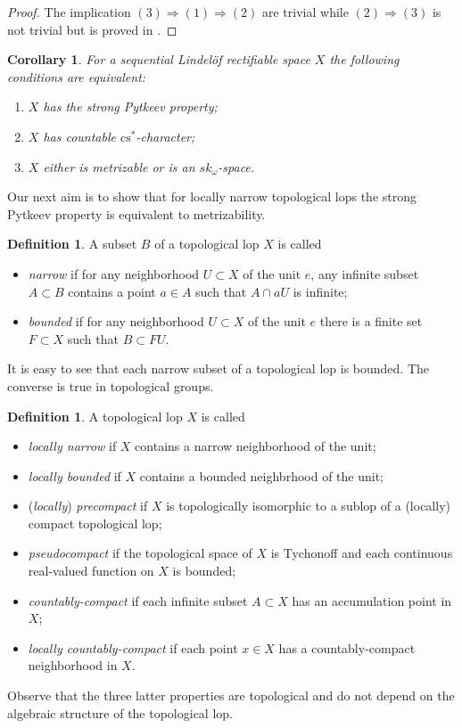 \documentclass{amsart}
\newtheorem{corollary}[theorem]{Corollary}
\theoremstyle{definition}
\newtheorem{definition}[theorem]{Definition}
\begin{document}
\begin{proof} The implication $(3){\Rightarrow}(1){\Rightarrow}(2)$ are trivial while $(2){\Rightarrow}(3)$ is not trivial but is proved in \cite{BR}.
\end{proof}

\begin{corollary}\label{t:normrec} For a sequential Lindel\"of rectifiable space $X$ the following conditions are equivalent:
\begin{enumerate}
\item $X$ has the strong Pytkeev property;
\item $X$ has countable ${\mathrm{cs}}^*$-character;
\item $X$  either is metrizable or is an $sk_{\omega}$-space.
\end{enumerate}
\end{corollary}

Our next aim is to show that for locally narrow topological lops the strong Pytkeev property is equivalent to metrizability.

\begin{definition} A subset $B$ of a topological lop $X$ is called
\begin{itemize}
\item {\em narrow} if for any neighborhood $U\subset X$ of the unit $e$, any infinite subset $A\subset B$ contains a point $a\in A$ such that $A\cap aU$ is infinite;
\item {\em bounded} if for any neighborhood $U\subset X$ of the unit $e$ there is a finite set $F\subset X$ such that $B\subset FU$.
\end{itemize}
\end{definition}

It is easy to see that each narrow subset of a topological lop is bounded. The converse is true in topological groups.

\begin{definition} A topological lop $X$ is called
\begin{itemize}
\item {\em locally narrow} if $X$ contains a narrow neighborhood of the unit;
\item {\em locally bounded} if $X$ contains a bounded neighbrhood of the unit;
\item ({\em locally}) {\em precompact} if $X$ is topologically isomorphic to a sublop of a (locally) compact topological lop;
\vskip2pt

\item {\em pseudocompact} if the topological space of $X$ is Tychonoff and each continuous real-valued function on $X$ is bounded;
\item {\em countably-compact} if each infinite subset $A\subset X$ has an accumulation point in $X$;
\item {\em locally countably-compact} if each point $x\in X$ has a countably-compact neighborhood in $X$.
\end{itemize}
\end{definition}
Observe that the three latter properties are topological and do not depend on the algebraic structure of the topological lop.
\end{document}
